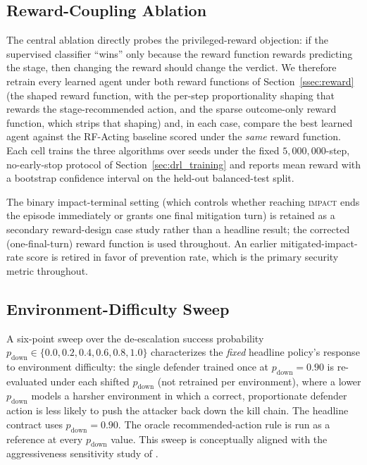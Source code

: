 \subsection{Reward-Coupling Ablation}\label{ssec:f9}
The central ablation directly probes the privileged-reward objection: if the supervised classifier ``wins'' only because the reward function rewards predicting the stage, then changing the reward should change the verdict. We therefore retrain every learned agent under both reward functions of Section~\ref{ssec:reward} (the shaped reward function, with the per-step proportionality shaping that rewards the stage-recommended action, and the sparse outcome-only reward function, which strips that shaping) and, in each case, compare the best learned agent against the RF-Acting baseline scored under the \emph{same} reward function. Each cell trains the three algorithms over \NumSeeds{} seeds under the fixed $5{,}000{,}000$-step, no-early-stop protocol of Section~\ref{sec:drl_training} and reports mean reward with a bootstrap confidence interval on the held-out balanced-test split.

The binary impact-terminal setting (which controls whether reaching \textsc{impact} ends the episode immediately or grants one final mitigation turn) is retained as a secondary reward-design case study rather than a headline result; the corrected (one-final-turn) reward function is used throughout. An earlier mitigated-impact-rate score is retired in favor of prevention rate, which is the primary security metric throughout.

\subsection{Environment-Difficulty Sweep}\label{ssec:f10_method}
A six-point sweep over the de-escalation success probability $p_{\mathrm{down}} \in \{0.0, 0.2, 0.4, 0.6, 0.8, 1.0\}$ characterizes the \emph{fixed} headline policy's response to environment difficulty: the single defender trained once at $p_{\mathrm{down}} = 0.90$ is re-evaluated under each shifted $p_{\mathrm{down}}$ (not retrained per environment), where a lower $p_{\mathrm{down}}$ models a harsher environment in which a correct, proportionate defender action is less likely to push the attacker back down the kill chain. The headline contract uses $p_{\mathrm{down}} = 0.90$. The oracle recommended-action rule is run as a reference at every $p_{\mathrm{down}}$ value. This sweep is conceptually aligned with the aggressiveness sensitivity study of .

